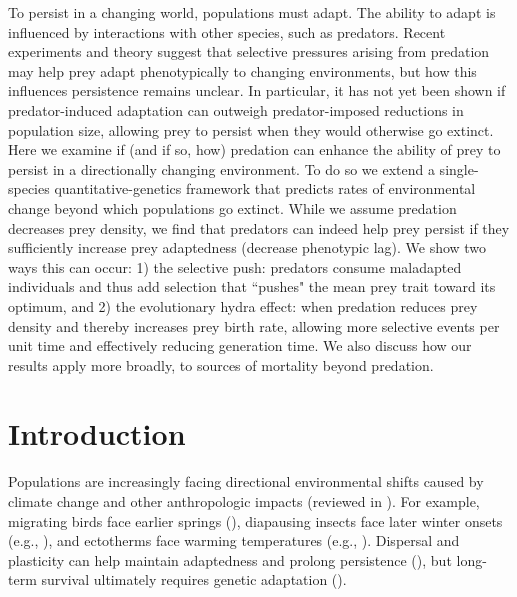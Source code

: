 \documentclass[11pt]{article}
\begin{document}
To persist in a changing world, populations must adapt. The ability to adapt is influenced by interactions with other species, such as predators. Recent experiments and theory suggest that selective pressures arising from predation may help prey adapt phenotypically to changing environments, but how this influences persistence remains unclear. In particular, it has not yet been shown if predator-induced adaptation can outweigh predator-imposed reductions in population size, allowing prey to persist when they would otherwise go extinct. Here we examine if (and if so, how) predation can enhance the ability of prey to persist in a directionally changing environment. To do so we extend a single-species quantitative-genetics framework that predicts rates of environmental change beyond which populations go extinct. While we assume predation decreases prey density, we find that predators can indeed help prey persist if they sufficiently increase prey adaptedness (decrease phenotypic lag). We show two ways this can occur: 1) the selective push: predators consume maladapted individuals and thus add selection that ``pushes" the mean prey trait toward its optimum, and 2) the evolutionary hydra effect: when predation reduces prey density and thereby increases prey birth rate, allowing more selective events per unit time and effectively reducing generation time. We also discuss how our results apply more broadly, to sources of mortality beyond predation.

\newpage{}

\section*{Introduction}



Populations are increasingly facing directional environmental shifts caused by climate change and other anthropologic impacts (reviewed in \citealt{Parmesan2003,Davis2005,Parmesan2006,Visser2008,Lavergne2010,Hoffmann2011}).
For example, migrating birds face earlier springs (\citealt{Moller2008}), diapausing insects face later winter onsets (e.g., \citealt{Bradshaw2001}), and ectotherms face warming temperatures (e.g., \citealt{Huey2009,Thomas2012}).
Dispersal and plasticity can help maintain adaptedness and prolong persistence (\citealt{Holt1990,Gienapp2008}), but long-term survival ultimately requires genetic adaptation (\citealt{Visser2008,Gienapp2013}).
\end{document}
